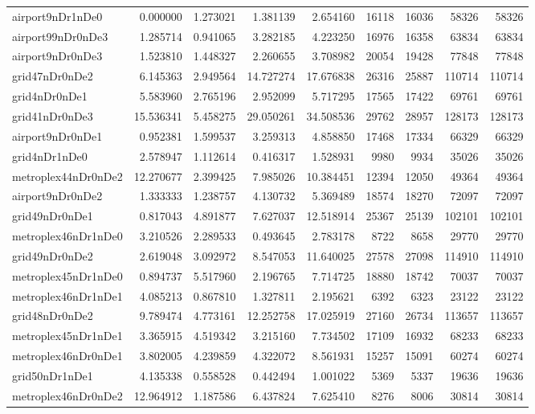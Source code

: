 \begin{longtable}{|l|r|r|r|r|r|r|r|r|}
airport9nDr1nDe0 & 0.000000 & 1.273021 & 1.381139 & 2.654160 & 16118 & 16036 & 58326 & 58326 \\
airport99nDr0nDe3 & 1.285714 & 0.941065 & 3.282185 & 4.223250 & 16976 & 16358 & 63834 & 63834 \\
airport9nDr0nDe3 & 1.523810 & 1.448327 & 2.260655 & 3.708982 & 20054 & 19428 & 77848 & 77848 \\
grid47nDr0nDe2 & 6.145363 & 2.949564 & 14.727274 & 17.676838 & 26316 & 25887 & 110714 & 110714 \\
grid4nDr0nDe1 & 5.583960 & 2.765196 & 2.952099 & 5.717295 & 17565 & 17422 & 69761 & 69761 \\
grid41nDr0nDe3 & 15.536341 & 5.458275 & 29.050261 & 34.508536 & 29762 & 28957 & 128173 & 128173 \\
airport9nDr0nDe1 & 0.952381 & 1.599537 & 3.259313 & 4.858850 & 17468 & 17334 & 66329 & 66329 \\
grid4nDr1nDe0 & 2.578947 & 1.112614 & 0.416317 & 1.528931 & 9980 & 9934 & 35026 & 35026 \\
metroplex44nDr0nDe2 & 12.270677 & 2.399425 & 7.985026 & 10.384451 & 12394 & 12050 & 49364 & 49364 \\
airport9nDr0nDe2 & 1.333333 & 1.238757 & 4.130732 & 5.369489 & 18574 & 18270 & 72097 & 72097 \\
grid49nDr0nDe1 & 0.817043 & 4.891877 & 7.627037 & 12.518914 & 25367 & 25139 & 102101 & 102101 \\
metroplex46nDr1nDe0 & 3.210526 & 2.289533 & 0.493645 & 2.783178 & 8722 & 8658 & 29770 & 29770 \\
grid49nDr0nDe2 & 2.619048 & 3.092972 & 8.547053 & 11.640025 & 27578 & 27098 & 114910 & 114910 \\
metroplex45nDr1nDe0 & 0.894737 & 5.517960 & 2.196765 & 7.714725 & 18880 & 18742 & 70037 & 70037 \\
metroplex46nDr1nDe1 & 4.085213 & 0.867810 & 1.327811 & 2.195621 & 6392 & 6323 & 23122 & 23122 \\
grid48nDr0nDe2 & 9.789474 & 4.773161 & 12.252758 & 17.025919 & 27160 & 26734 & 113657 & 113657 \\
metroplex45nDr1nDe1 & 3.365915 & 4.519342 & 3.215160 & 7.734502 & 17109 & 16932 & 68233 & 68233 \\
metroplex46nDr0nDe1 & 3.802005 & 4.239859 & 4.322072 & 8.561931 & 15257 & 15091 & 60274 & 60274 \\
grid50nDr1nDe1 & 4.135338 & 0.558528 & 0.442494 & 1.001022 & 5369 & 5337 & 19636 & 19636 \\
metroplex46nDr0nDe2 & 12.964912 & 1.187586 & 6.437824 & 7.625410 & 8276 & 8006 & 30814 & 30814 \\

\end{longtable}
